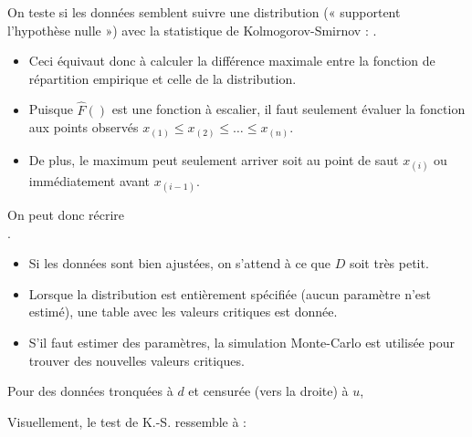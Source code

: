 \documentclass[10pt, french]{article}
\begin{document}
\begin{multicols*}{2}
\begin{definitionNOHFILLsub}
On teste si les données semblent suivre une distribution (« supportent l'hypothèse nulle ») avec la statistique de Kolmogorov-Smirnov : .
\begin{itemize}
	\item	Ceci équivaut donc à calculer la différence maximale entre la fonction de répartition empirique et celle de la distribution.
	\item	Puisque $\hat{F}()$ est une fonction à escalier, il faut seulement évaluer la fonction aux points observés $x_{(1)}	\leq	x_{(2)}	\leq	\hdots	\leq	x_{(n)}$.
	\item	De plus, le maximum peut seulement arriver soit au point de saut $x_{(i)}$ ou immédiatement avant $x_{(i - 1)}$.
\end{itemize}

On peut donc récrire\\ .

\begin{itemize}
	\item	Si les données sont bien ajustées, on s'attend à ce que $D$ soit très petit.
	\item	Lorsque la distribution est entièrement spécifiée (aucun paramètre n’est estimé), une table avec les valeurs critiques est donnée.
	\item	S'il faut estimer des paramètres, la simulation Monte-Carlo est utilisée pour trouver des nouvelles valeurs critiques.
\end{itemize}
\end{definitionNOHFILLsub}

\begin{definitionNOHFILLprop}
Pour des données tronquées à $d$ et censurée (vers la droite) à $u$, 
\end{definitionNOHFILLprop}

Visuellement, le test de K.-S. ressemble à :
\begin{center}


\end{center}
\end{multicols*}
\end{document}
